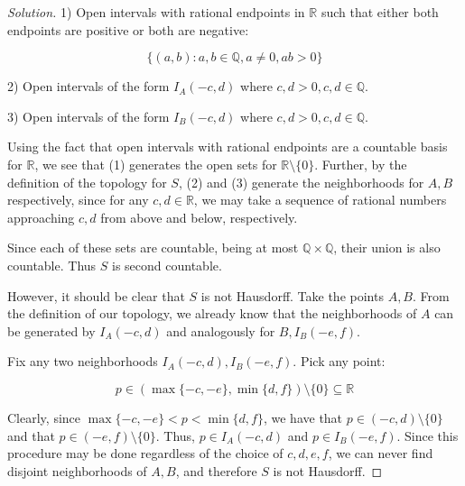 \documentclass[10pt]{article}
\begin{document}
\begin{proof}[Solution]
1) Open intervals with rational endpoints in $\mathbb{R}$ such that either both endpoints are positive or both are negative:

$$ \{ (a,b) : a,b \in \mathbb{Q}, a \not = 0, ab > 0 \}$$

2) Open intervals of the form $I_A(-c,d)$ where $c,d > 0, c,d \in \mathbb{Q}$.

3) Open intervals of the form $I_B(-c,d)$ where $c,d > 0, c,d \in \mathbb{Q}$.

Using the fact that open intervals with rational endpoints are a countable basis for $\mathbb{R}$, we see that (1) generates the open sets for $\mathbb{R} \setminus \{ 0 \}$. Further, by the definition of the topology for $S$, (2) and (3) generate the neighborhoods for $A, B$ respectively, since for any $c,d \in \mathbb{R}$, we may take a sequence of rational numbers approaching $c, d$ from above and below, respectively.

Since each of these sets are countable, being at most $\mathbb{Q} \times \mathbb{Q}$, their union is also countable. Thus $S$ is second countable.

However, it should be clear that $S$ is not Hausdorff. Take the points $A, B$. From the definition of our topology, we already know that the neighborhoods of $A$ can be generated by $I_A(-c,d)$ and analogously for $B, I_B(-e,f)$. 

Fix any two neighborhoods $I_A(-c,d), I_B(-e,f)$. Pick any point:

$$p \in (\max\{-c,-e\}, \min\{d, f\}) \setminus \{ 0 \}\subseteq \mathbb{R}$$

Clearly, since $\max\{ -c, -e \} < p < \min\{ d,f \}$, we have that $p \in (-c,d) \setminus \{ 0 \}$ and that $p \in (-e,f) \setminus \{ 0 \}$. Thus, $p \in I_A(-c,d)$ and $p \in I_B(-e,f)$. Since this procedure may be done regardless of the choice of $c,d,e,f$, we can never find disjoint neighborhoods of $A,B$, and therefore $S$ is not Hausdorff.


\end{proof}
\end{document}

